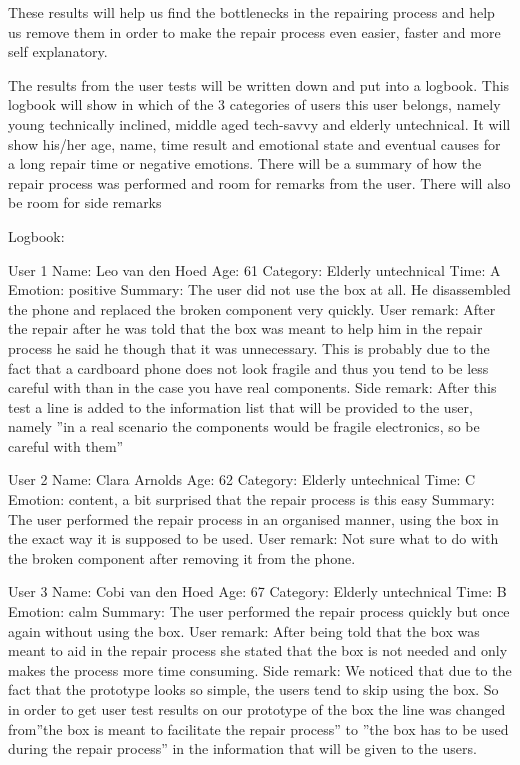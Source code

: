 \documentclass[final,a4paper]{report} %
\begin{document}
	These results will help us find the bottlenecks in the repairing process and help us remove them in order to make the repair process even easier, faster and more self explanatory. 
	
	The results from the user tests will be written down and put into a logbook. This logbook will show in which of the 3 categories of users this user belongs, namely young technically inclined, middle aged tech-savvy and elderly untechnical. It will show his/her age, name, time result  and emotional state and eventual causes for a long repair time or negative emotions. There will be a summary of how the repair process was performed and room for remarks from the user. There will also be room for side remarks
	
	Logbook:
	
	User 1
	Name:			Leo van den Hoed
	Age:			61
	Category:		Elderly untechnical
	Time:			A 
	Emotion:		positive
	Summary: 		The user did not use the box at all. He disassembled the phone and replaced the broken component very quickly.
	User remark:	After the repair after he was told that the box was meant to help him in the repair process he said he though that it was unnecessary. This is probably due to the fact that a cardboard phone does not look fragile and thus you tend to be less careful with than in the case you have real components.
	Side remark:	After this test a line is added to the information list that will be provided to the user, namely ''in a real scenario the components would be fragile electronics, so be careful with them''
	
	User 2
	Name:			Clara Arnolds	
	Age:			62
	Category:		Elderly untechnical
	Time:			C
	Emotion:		content, a bit surprised that the repair process is this easy
	Summary: 		The user performed the repair process in an organised manner, using the box in the exact way it is supposed to be used.
	User remark:	Not sure what to do with the broken component after removing it from the phone. 
		
	User 3 
	Name: 			Cobi van den Hoed	
	Age:			67
	Category:		Elderly untechnical
	Time:			B
	Emotion: 		calm 
	Summary:		The user performed the repair process quickly but once again without using the box.
	User remark:	After being told that the box was meant to aid in the repair process she stated that the box is not needed and only makes the process more time consuming. 
	Side remark:	We noticed that due to the fact that the prototype looks so simple, the users tend to skip using the box. So in order to get user test results on our prototype of the box the line was changed from''the box is meant to facilitate the repair process'' to ''the box has to be used during the repair process'' in the information that will be given to the users.
\end{document}

